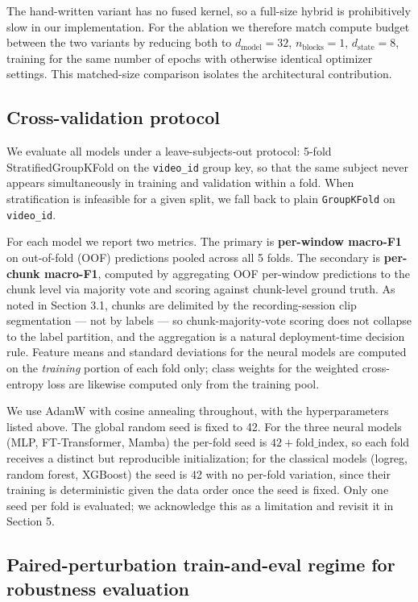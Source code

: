 \documentclass{article}
\begin{document}
The hand-written variant has no fused kernel, so a full-size hybrid is prohibitively slow in our implementation. For the ablation we therefore match compute budget between the two variants by reducing both to $d_\text{model} = 32$, $n_\text{blocks} = 1$, $d_\text{state} = 8$, training for the same number of epochs with otherwise identical optimizer settings. This matched-size comparison isolates the architectural contribution.

\subsection{Cross-validation protocol}

We evaluate all models under a leave-subjects-out protocol: 5-fold StratifiedGroupKFold on the \texttt{video\_id} group key, so that the same subject never appears simultaneously in training and validation within a fold. When stratification is infeasible for a given split, we fall back to plain \texttt{GroupKFold} on \texttt{video\_id}.

For each model we report two metrics. The primary is \textbf{per-window macro-F1} on out-of-fold (OOF) predictions pooled across all 5 folds. The secondary is \textbf{per-chunk macro-F1}, computed by aggregating OOF per-window predictions to the chunk level via majority vote and scoring against chunk-level ground truth. As noted in Section 3.1, chunks are delimited by the recording-session clip segmentation --- not by labels --- so chunk-majority-vote scoring does not collapse to the label partition, and the aggregation is a natural deployment-time decision rule. Feature means and standard deviations for the neural models are computed on the \emph{training} portion of each fold only; class weights for the weighted cross-entropy loss are likewise computed only from the training pool.

We use AdamW with cosine annealing throughout, with the hyperparameters listed above. The global random seed is fixed to 42. For the three neural models (MLP, FT-Transformer, Mamba) the per-fold seed is $42 + \text{fold\_index}$, so each fold receives a distinct but reproducible initialization; for the classical models (logreg, random forest, XGBoost) the seed is 42 with no per-fold variation, since their training is deterministic given the data order once the seed is fixed. Only one seed per fold is evaluated; we acknowledge this as a limitation and revisit it in Section 5.

\subsection{Paired-perturbation train-and-eval regime for robustness evaluation}
\end{document}
